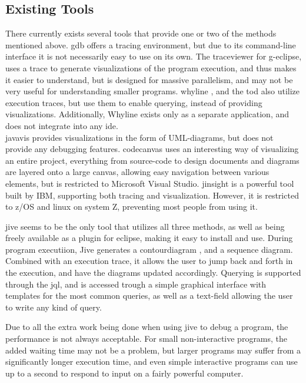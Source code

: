 \subsection{Existing Tools}\label{PreTools}
There currently exists several tools that provide one or two of the methods mentioned above.
\Gls{gdb} offers a tracing environment, but due to its command-line interface %
it is not necessarily easy to use on its own.
The \gls{traceviewer} \cite{Kranzlmuller} for g-eclipse, uses a trace to generate visualizations of the program execution, and thus makes it easier to understand, but is designed for massive parallelism, and may not be very useful for understanding smaller programs.
\Gls{whyline} \cite{ko2009}, and the \gls{tod} \cite{Pothier2007} also utilize execution traces, but use them to enable querying, instead of providing visualizations.
Additionally, Whyline exists only as a separate application, and does not integrate into any \gls{ide}.
~\\

\Gls{javavis} \cite{Oechsle2002} provides visualizations in the form of UML-diagrams, but does not provide any debugging features.
\Gls{codecanvas} uses an interesting way of visualizing an entire project, everything from source-code to design documents and diagrams are layered onto a large canvas, allowing easy navigation between various elements, but is restricted to Microsoft Visual Studio.
\Gls{jinsight} \cite{Pauw} is a powerful tool built by IBM, supporting both tracing and visualization.
However, it is restricted to z/OS and linux on system Z, preventing most people from using it.
~\\

\begin{sloppypar}
\Gls{jive} seems to be the only tool that utilizes all three methods, as well as being freely available as a plugin for eclipse, making it easy to install and use.
During program executiion, Jive generates a \gls{contourdiagram} \cite{Jayaraman1996}, and a sequence diagram.
Combined with an execution trace, it allows the user to jump back and forth in the execution, and have the diagrams updated accordingly.
Querying is supported through the \gls{jql}, and is accessed trough a simple graphical interface with templates for the most common queries, as well as a text-field allowing the user to write any kind of query.
~\\
\end{sloppypar}

Due to all the extra work being done when using jive to debug a program, the performance is not always acceptable.
For small non-interactive programs, the added waiting time may not be a problem, but larger programs may suffer from a significantly longer execution time, and even simple interactive programs can use up to a second to respond to input on a fairly powerful computer.
~\\





